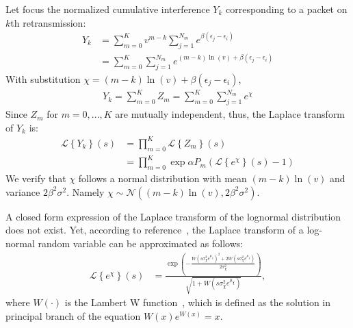 Let focus the normalized cumulative interference $Y_k$ corresponding to a packet on $k$th retransmission:
\begin{align*}
Y_k &=\sum_{m=0}^{K} v^{m-k}\sum_{j=1}^{N_m} e^{\beta \left( \epsilon_j - \epsilon_i \right) } \\
&=\sum_{m=0}^{K}\sum_{j=1}^{N_m} e^{\left(m-k\right) \ln(v)+\beta \left( \epsilon_j - \epsilon_i \right) } 
\end{align*}
With substitution $\chi = \left(m-k\right) \ln(v)+\beta \left( \epsilon_j - \epsilon_i \right)$, 
\begin{align}
	Y_k=\sum_{m=0}^{K} Z_m  = \sum_{m=0}^{K}\sum_{j=1}^{N_m} e^{\chi}
\end{align} 
Since $Z_m$ for $m=0,...,K$ are mutually independent, thus, the Laplace transform of $Y_k$ is:
\begin{align}
	\label{eq:laplace-transform-y-form-1}
	\mathcal{L} \left\lbrace Y_k \right\rbrace \left( s \right) &= \prod_{m=0}^{K} \mathcal{L} \left\lbrace Z_m \right\rbrace \left( s \right) \nonumber\\
	&=\prod_{m=0}^{K} \exp{\alpha P_m \left(  \mathcal{L} \left\lbrace e^{\chi} \right\rbrace \left( s \right)  - 1\right) }
\end{align}
We verify that $\chi$ follows a normal distribution with mean $\left(m-k\right) \ln(v)$ and variance $2\beta^2\sigma^2$. Namely $\chi \sim \mathcal{N}\left( \left(m-k\right) \ln(v), 2\beta^2\sigma^2\right)$.

A closed form expression of the Laplace transform of the lognormal distribution does not
exist. Yet, according to reference~\cite{asmussen2016laplace}, the Laplace transform of a log-normal random variable can be approximated as follows:
\begin{align}
\label{eq:laplace-transform-lognormal-form-1}
\mathcal{L} \left\lbrace e^{\chi} \right\rbrace \left( s \right)
&= \frac{\exp(-\frac{W(s \sigma_{\chi}^2 e^{\mu_{\chi}} )^2 + 2W(s \sigma_{\chi}^2 e^{\mu_{\chi}})}{2\sigma_{\chi}^2})}{\sqrt{1 + W(s \sigma_{\chi}^2 e^{\mu_{\chi}})}},
\end{align}
where $W\left( \cdot \right)$ is the Lambert W function~\cite{corless1996lambertw}, which is defined as the solution in principal branch of the
equation $W\left(x\right) e^{W \left( x\right) }= x$.

